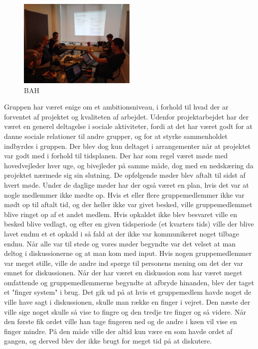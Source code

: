 \begin{figure}[ht!]
    \centering
    \includegraphics[width=0.5\textwidth]{Images/8.jpg}
    \caption{BAH}
    \label{4}
\end{figure}
Gruppen har været enige om et ambitionsniveau, i forhold til hvad der ar forventet af projektet og kvaliteten af arbejdet. Udenfor projektarbejdet har der været en generel deltagelse i sociale aktiviteter, fordi at det har været godt for at danne sociale relationer til andre grupper, og for at styrke sammenholdet indbyrdes i gruppen. Der blev dog kun deltaget i arrangementer når at projektet var godt med i forhold til tidsplanen. 
Der har som regel været møde med hovedvejleder hver uge, og bivejleder på samme måde, dog med en nedskæring da projektet nærmede sig sin slutning. De opfølgende møder blev aftalt til sidst af hvert møde. Under de daglige møder har der også været en plan, hvis det var at nogle medlemmer ikke mødte op. Hvis et eller flere gruppemedlemmer ikke var mødt op til aftalt tid, og der heller ikke var givet besked, ville gruppemedlemmet blive ringet op af et andet medlem. Hvis opkaldet ikke blev besvaret ville en besked blive vedlagt, og efter en given tidsperiode (et kvarters tids) ville der blive lavet endnu et et opkald i så fald at der ikke var kommunikeret noget tilbage endnu. Når alle var til stede og vores møder begyndte var det velset at man deltog i diskussionerne og at man kom med input. Hvis nogen gruppemedlemmer var meget stille, ville de andre ind spørge til personens mening om det der var emnet for diskussionen. Når der har været en diskussion som har været meget omfattende og gruppemedlemmerne begyndte at afbryde hinanden, blev der taget et "finger system" i brug. Det gik ud på at hvis et gruppemedlem havde noget de ville have sagt i diskussionen, skulle man række en finger i vejret. Den næste der ville sige noget skulle så vise to fingre og den tredje tre finger og så videre. Når den første fik ordet ville han tage fingeren ned og de andre i køen vil vise en finger mindre. På den måde ville der altid kun være en som havde ordet af gangen, og derved blev der ikke brugt for meget tid på at diskutere.

